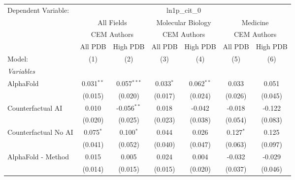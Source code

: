 \begingroup
\centering
\begin{tabular}{lcccccc}
   \tabularnewline \midrule \midrule
   Dependent Variable: & \multicolumn{6}{c}{ln1p\_cit\_0}\\
 & \multicolumn{2}{c}{All Fields} & \multicolumn{2}{c}{Molecular Biology} & \multicolumn{2}{c}{Medicine} \\
\cmidrule(lr){2-3} \cmidrule(lr){4-5} \cmidrule(lr){6-7}
 & \multicolumn{2}{c}{CEM Authors} & \multicolumn{2}{c}{CEM Authors} & \multicolumn{2}{c}{CEM Authors} \\
\cmidrule(lr){2-3} \cmidrule(lr){4-5} \cmidrule(lr){6-7}
 & \multicolumn{1}{c}{All PDB} & \multicolumn{1}{c}{High PDB} & \multicolumn{1}{c}{All PDB} & \multicolumn{1}{c}{High PDB} & \multicolumn{1}{c}{All PDB} & \multicolumn{1}{c}{High PDB} \\
\cmidrule(lr){2-2} \cmidrule(lr){3-3} \cmidrule(lr){4-4} \cmidrule(lr){5-5} \cmidrule(lr){6-6} \cmidrule(lr){7-7}
   Model:                                                     & (1)          & (2)           & (3)         & (4)          & (5)         & (6)\\  
   \midrule
   \emph{Variables}\\
   AlphaFold                                                  & 0.031$^{**}$ & 0.057$^{***}$ & 0.033$^{*}$ & 0.062$^{**}$ & 0.033       & 0.051\\   
                                                              & (0.015)      & (0.020)       & (0.017)     & (0.024)      & (0.026)     & (0.045)\\   
   Counterfactual AI                                          & 0.010        & -0.056$^{**}$ & 0.018       & -0.042       & -0.018      & -0.122\\   
                                                              & (0.020)      & (0.025)       & (0.023)     & (0.038)      & (0.054)     & (0.083)\\   
   Counterfactual No AI                                       & 0.075$^{*}$  & 0.100$^{*}$   & 0.044       & 0.026        & 0.127$^{*}$ & 0.125\\   
                                                              & (0.041)      & (0.052)       & (0.040)     & (0.047)      & (0.063)     & (0.097)\\   
   AlphaFold - Method                                         & 0.015        & 0.005         & 0.024       & 0.004        & -0.032      & -0.029\\   
                                                              & (0.014)      & (0.015)       & (0.015)     & (0.020)      & (0.037)     & (0.046)\\   

\end{tabular}
